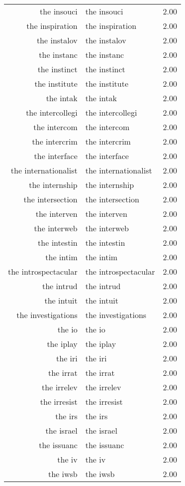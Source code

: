 \begin{table}[ht]
\begin{tabular}{rlr}
  the insouci & the insouci & 2.00 \\ 
  the inspiration & the inspiration & 2.00 \\ 
  the instalov & the instalov & 2.00 \\ 
  the instanc & the instanc & 2.00 \\ 
  the instinct & the instinct & 2.00 \\ 
  the institute & the institute & 2.00 \\ 
  the intak & the intak & 2.00 \\ 
  the intercollegi & the intercollegi & 2.00 \\ 
  the intercom & the intercom & 2.00 \\ 
  the intercrim & the intercrim & 2.00 \\ 
  the interface & the interface & 2.00 \\ 
  the internationalist & the internationalist & 2.00 \\ 
  the internship & the internship & 2.00 \\ 
  the intersection & the intersection & 2.00 \\ 
  the interven & the interven & 2.00 \\ 
  the interweb & the interweb & 2.00 \\ 
  the intestin & the intestin & 2.00 \\ 
  the intim & the intim & 2.00 \\ 
  the introspectacular & the introspectacular & 2.00 \\ 
  the intrud & the intrud & 2.00 \\ 
  the intuit & the intuit & 2.00 \\ 
  the investigations & the investigations & 2.00 \\ 
  the io & the io & 2.00 \\ 
  the iplay & the iplay & 2.00 \\ 
  the iri & the iri & 2.00 \\ 
  the irrat & the irrat & 2.00 \\ 
  the irrelev & the irrelev & 2.00 \\ 
  the irresist & the irresist & 2.00 \\ 
  the irs & the irs & 2.00 \\ 
  the israel & the israel & 2.00 \\ 
  the issuanc & the issuanc & 2.00 \\ 
  the iv & the iv & 2.00 \\ 
  the iwsb & the iwsb & 2.00 \\ 

\end{tabular}
\end{table}

